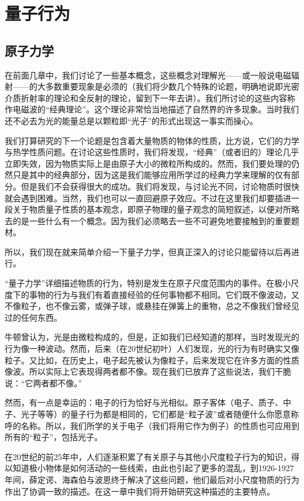 \chapter{量子行为}

\section{原子力学}

在前面几章中，我们讨论了一些基本概念，这些概念对理解光——或一般说电磁辐射——的大多数重要现象是必须的（我们将少数几个特殊的论题，明确地说即光密介质折射率的理论和全反射的理论，留到下一年去讲）。我们所讨论的这些内容称作电磁波的“经典理论”。这个理论非常恰当地描述了自然界的许多现象。当时我们还不必去为光的能量总是以颗粒即“光子”的形式出现这一事实而操心。

我们打算研究的下一个论题是包含着大量物质的物体的性质，比方说，它们的力学与热学性质问题。在讨论这些性质时，我们将发现，“经典”（或者旧的）理论几乎立即失效，因为物质实际上是由原子大小的微粒所构成的。然而，我们要处理的仍然只是其中的经典部分，因为这是我们能够应用所学过的经典力学来理解的仅有部分。但是我们不会获得很大的成功。我们将发现，与讨论光不同，讨论物质时很快就会遇到困难。当然，我们也可以一直回避原子效应。不过在这里我们却要插进一段关于物质量子性质的基本观念，即原子物理的量子观念的简短叙述，以便对所略去的是一些什么有一个概念。因为我们必须略去一些不可避免地要接触到的重要题材。

所以，我们现在就来简单介绍一下量子力学，但真正深入的讨论只能留待以后再进行。

“量子力学”详细描述物质的行为，特别是发生在原子尺度范围内的事件。在极小尺度下的事物的行为与我们有着直接经验的任何事物都不相同。它们既不像波动，又不像粒子，也不像云雾，或弹子球，或悬挂在弹簧上的重物，总之不像我们曾经见过的任何东西。

牛顿曾认为，光是由微粒构成的，但是，正如我们已经知道的那样，当时发现光的行为像一种波动。然而，后来（在20世纪初叶）人们发现，光的行为有时确实又像粒子。又比如，在历史上，电子起先被认为像粒子，后来发现它在许多方面的性质像波。所以实际上它表现得两者都不像。现在我们已放弃了这些说法，我们干脆说：“它两者都不像。”

然而，有一点是幸运的：电子的行为恰好与光相似。原子客体（电子、质子、中子、光子等等）的量子行为都是相同的，它们都是“粒子波”或者随便什么你愿意称呼的名称。所以，我们所学的关于电子（我们将用它作为例子）的性质也可应用到所有的“粒子”，包括光子。

在20世纪的前25年中，人们逐渐积累了有关原子与其他小尺度粒子行为的知识，得以知道极小物体是如何活动的一些线索，由此也引起了更多的混乱，到1926-1927年间，薛定谔、海森伯与波恩终于解决了这些问题，他们最后对小尺度物质的行为作出了协调一致的描述。在这一章中我们将开始研究这种描述的主要特点。

